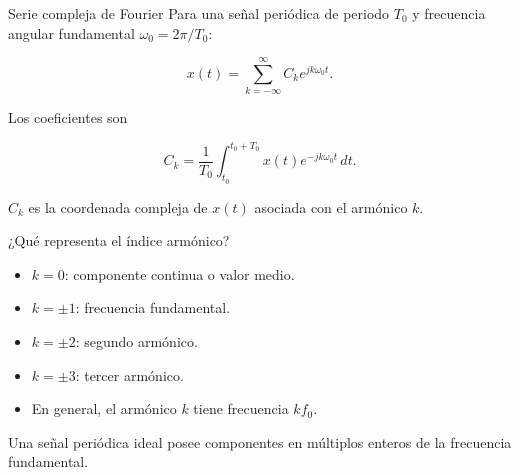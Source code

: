 \documentclass[
  ignorenonframetext,
  aspectratio=169,
  spanish,
  professionalfonts]{beamer}
\providecommand{\tightlist}{%
  \setlength{\itemsep}{0pt}\setlength{\parskip}{0pt}}
\begin{document}
\begin{frame}{Serie compleja de Fourier}
\protect{}\label{serie-compleja-de-fourier}
Para una señal periódica de periodo \(T_0\) y frecuencia angular
fundamental \(\omega_0=2\pi/T_0\):

\[
x(t)=\sum_{k=-\infty}^{\infty}C_k e^{jk\omega_0t}.
\]

Los coeficientes son

\[
C_k=\frac{1}{T_0}\int_{t_0}^{t_0+T_0}
x(t)e^{-jk\omega_0t}\,dt.
\]

\begin{tcolorbox}[enhanced jigsaw, arc=.35mm, bottomrule=.15mm, bottomtitle=1mm, breakable, colback=white, colbacktitle=quarto-callout-important-color!10!white, colframe=quarto-callout-important-color-frame, coltitle=black, left=2mm, leftrule=.75mm, opacityback=0, opacitybacktitle=0.6, rightrule=.15mm, title={Significado}, titlerule=0mm, toprule=.15mm, toptitle=1mm]

\(C_k\) es la coordenada compleja de \(x(t)\) asociada con el armónico
\(k\).

\end{tcolorbox}
\end{frame}

\begin{frame}{¿Qué representa el índice armónico?}
\protect{}\label{quuxe9-representa-el-uxedndice-armuxf3nico}
\begin{itemize}
\tightlist
\item
  \(k=0\): componente continua o valor medio.
\item
  \(k=\pm1\): frecuencia fundamental.
\item
  \(k=\pm2\): segundo armónico.
\item
  \(k=\pm3\): tercer armónico.
\item
  En general, el armónico \(k\) tiene frecuencia \(k f_0\).
\end{itemize}

\begin{tcolorbox}[enhanced jigsaw, arc=.35mm, bottomrule=.15mm, bottomtitle=1mm, breakable, colback=white, colbacktitle=quarto-callout-note-color!10!white, colframe=quarto-callout-note-color-frame, coltitle=black, left=2mm, leftrule=.75mm, opacityback=0, opacitybacktitle=0.6, rightrule=.15mm, title={Espectro de líneas}, titlerule=0mm, toprule=.15mm, toptitle=1mm]

Una señal periódica ideal posee componentes en múltiplos enteros de la
frecuencia fundamental.

\end{tcolorbox}
\end{frame}
\end{document}
